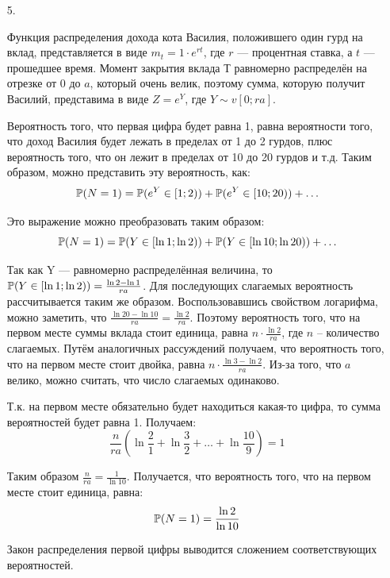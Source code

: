 \begin{enumerate}
\begin{enumerate}
\item[5.]

Функция распределения дохода кота Василия, положившего один гурд на вклад, представляется в виде $m_t = 1\cdot e^{rt}$, где $r$ — процентная ставка, а $t$ — прошедшее время. Момент закрытия вклада Т равномерно распределён на отрезке от 0 до $a$, который очень велик, поэтому сумма, которую получит Василий, представима в виде $Z = e^{Y}$, где $Y \sim v[0; ra]$.

Вероятность того, что первая цифра будет равна 1, равна вероятности того, что доход Василия будет лежать в пределах от 1 до 2 гурдов, плюс вероятность того, что он лежит в пределах от 10 до 20 гурдов и т.д. Таким образом, можно представить эту вероятность, как:
\[
\P(N=1) = \P(e^Y \in [1;2) ) + \P(e^Y \in [10; 20) ) + \ldots
\]

Это выражение можно преобразовать таким образом:
\[
\P(N=1) = \P(Y \in [\ln 1; \ln2) ) + \P(Y \in [\ln 10; \ln 20) ) + \ldots
\]

Так как Y — равномерно распределённая величина, то $\P(Y \in [\ln 1; \ln2) ) = \frac{\ln 2 - \ln 1}{ra}$. Для последующих слагаемых вероятность рассчитывается таким же образом. Воспользовавшись свойством логарифма, можно заметить, что $\frac{\ln 20 - \ln 10}{ra} = \frac{\ln 2}{ra}$. Поэтому вероятность того, что на первом месте суммы вклада стоит единица, равна $n\cdot \frac{\ln 2}{ra}$, где $n$ -- количество слагаемых. Путём аналогичных рассуждений получаем, что вероятность того, что на первом месте стоит двойка, равна $n\cdot \frac{\ln 3- \ln 2}{ra}$. Из-за того, что $a$ велико, можно считать, что число слагаемых одинаково.

Т.к. на первом месте обязательно будет находиться какая-то цифра, то сумма вероятностей будет равна 1. Получаем:
\[
\dfrac{n}{ra}(\ln \frac{2}{1} + \ln \frac{3}{2} + \ldots + \ln \frac{10}{9}) = 1
\]

Таким образом $\frac{n}{ra} = \frac{1}{\ln 10}$. Получается, что вероятность того, что на первом месте стоит единица, равна:
\[
\P (N=1) = \dfrac{\ln 2}{\ln 10}
\]

Закон распределения первой цифры выводится сложением соответствующих вероятностей.


\end{enumerate}




\end{enumerate}
